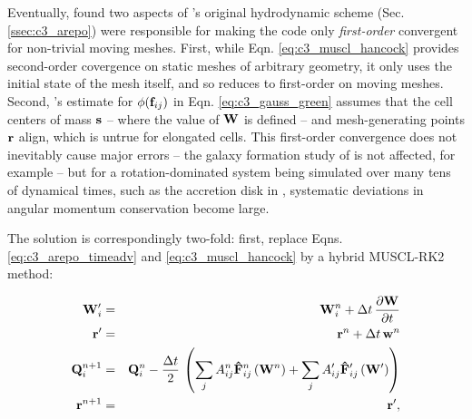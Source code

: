 
Eventually, \cite{pakm+16} found two aspects of \arepo's original hydrodynamic scheme (Sec. \ref{ssec:c3_arepo}) were responsible for making the code only \textit{first-order} convergent for non-trivial moving meshes.  First, while Eqn. \ref{eq:c3_muscl_hancock} provides second-order covergence on static meshes of arbitrary geometry, it only uses the initial state of the mesh itself, and so reduces to first-order on moving meshes.  Second, \arepo's estimate for $\phi({\bf f}_{ij})$ in Eqn. \ref{eq:c3_gauss_green} assumes that the cell centers of mass ${\bf s}$ -- where the value of ${\bf W}$ is defined -- and mesh-generating points ${\bf r}$ align, which is untrue for elongated cells.  This first-order convergence does not inevitably cause major errors -- the galaxy formation study of \cite{marips14} is not affected, for example -- but for a rotation-dominated system being simulated over many tens of dynamical times, such as the accretion disk in \cite{pakm+16}, systematic deviations in angular momentum conservation become large.

The solution is correspondingly two-fold: first, replace Eqns. \ref{eq:c3_arepo_timeadv} and \ref{eq:c3_muscl_hancock} by a hybrid MUSCL-RK2 method:

\begin{eqnarray}
{\bf W}^\prime_i &=& {\bf W}^n_i + \Delta t \, \frac{\partial {\bf W}}{\partial t} \nonumber \\
{\bf r}^\prime &=& {\bf r}^n +  \Delta t \, {\bf w}^n \nonumber \\
{\bf Q}^{n+1}_i &=& {\bf Q}^n_i - \frac{\Delta t}{2} \, \left( \sum_j A^n_{ij} {\bf \hat{F}}_{ij}^{n} \left( {\bf W}^n \right) + \sum_j A^\prime_{ij} {\bf \hat{F}}_{ij}^{\prime} \left( {\bf W}^\prime \right) \right) \nonumber \\
{\bf r}^{n+1} &=& {\bf r}^\prime,
\end{eqnarray}

